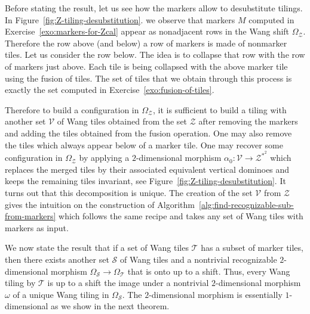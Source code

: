 \documentclass[12pt]{amsart}
\newcommand{\Scal}{\mathcal{S}}
\newcommand{\Tcal}{\mathcal{T}}
\newcommand{\Vcal}{\mathcal{V}}
\newcommand{\Zcal}{\mathcal{Z}}
\begin{document}
Before stating the result, let us see how the markers allow to desubstitute tilings. 
In Figure~\ref{fig:Z-tiling-desubstitution}.
we observe that markers $M$ computed in Exercise~\ref{exo:markers-for-Zcal}
appear as nonadjacent rows in the Wang shift $\Omega_\Zcal$. 
Therefore the row above
(and below) a row of markers is made of nonmarker tiles. Let us consider the row below.
The idea is to collapse that row with the row of markers just above. 
Each tile is being collapsed with the above marker tile using the fusion of tiles.
The set of tiles that we obtain through this process is exactly the set computed in
Exercise~\ref{exo:fusion-of-tiles}.

Therefore to build a configuration in $\Omega_\Zcal$, it is sufficient to build a tiling
with another set $\Vcal$ of Wang tiles obtained from the set $\Zcal$ after removing the
markers and adding the tiles obtained from the fusion operation. 
One may also remove the tiles which always appear below of a marker tile.
One may recover some configuration in $\Omega_\Zcal$ by applying a $2$-dimensional morphism
$\alpha_0:\Vcal\to\Zcal^{*^2}$
which replaces the merged tiles by their associated equivalent vertical dominoes
and keeps the remaining tiles invariant, see Figure~\ref{fig:Z-tiling-desubstitution}. 
It turns out
that this decomposition is unique.
The creation of the set $\Vcal$ from $\Zcal$ gives the intuition on the
construction of Algorithm~\ref{alg:find-recognizable-sub-from-markers} which 
follows the same recipe and takes any set of Wang tiles with markers as input.

We now state the result that
if a set of Wang tiles $\Tcal$ has a subset of marker tiles, then
there exists another set $\Scal$ of Wang tiles and a 
nontrivial recognizable $2$-dimensional morphism
$\Omega_\Scal\to\Omega_\Tcal$ that is onto up to a shift.
Thus, every Wang
tiling by $\Tcal$ is up to a shift the image under a nontrivial $2$-dimensional
morphism $\omega$ of a unique Wang tiling in $\Omega_\Scal$.
The $2$-dimensional morphism is essentially $1$-dimensional as we show in the
next theorem.
\end{document}
